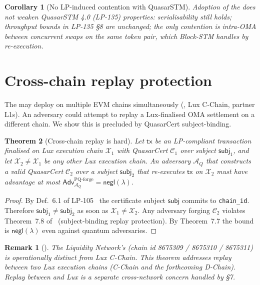 \documentclass[11pt]{article}
\newtheorem{theorem}{Theorem}
\newtheorem{corollary}[theorem]{Corollary}
\newtheorem{remark}{Remark}
\begin{document}
\begin{corollary}[No LP-induced contention with QuasarSTM]
\label{cor:no-contention}
Adoption of the  does not weaken QuasarSTM 4.0
(LP-135) properties: serialisability still holds; throughput bounds
in LP-135 \S8 are unchanged; the only contention is intra-OMA
between concurrent swaps on the same token pair, which Block-STM
handles by re-execution.
\end{corollary}

\section{Cross-chain replay protection}
\label{sec:replay}

The  may deploy on multiple EVM chains
simultaneously (, Lux C-Chain, partner L1s).  An adversary
could attempt to replay a Lux-finalised OMA settlement on a different
chain.  We show this is precluded by QuasarCert subject-binding.

\begin{theorem}[Cross-chain replay is hard]
\label{thm:replay}
Let $\mathsf{tx}$ be an LP-compliant transaction finalised on Lux
execution chain $\mathcal{X}_1$ with QuasarCert $\mathcal{C}_1$ over
subject $\mathsf{subj}_1$, and let $\mathcal{X}_2 \neq \mathcal{X}_1$
be any other Lux execution chain.  An adversary $\mathcal{A}_Q$ that
constructs a valid QuasarCert $\mathcal{C}_2$ over a subject
$\mathsf{subj}_2$ that re-executes $\mathsf{tx}$ on $\mathcal{X}_2$
must have advantage at most
$\mathsf{Adv}^{\mathrm{PQ\text{-}forge}}_{\mathcal{A}_Q} =
\mathsf{negl}(\lambda)$.
\end{theorem}

\begin{proof}
By Def.~6.1 of LP-105~\cite{quasar-cert} the certificate subject
$\mathsf{subj}$ commits to \texttt{chain\_id}.  Therefore
$\mathsf{subj}_1 \neq \mathsf{subj}_2$ as soon as
$\mathcal{X}_1 \neq \mathcal{X}_2$.  Any adversary forging
$\mathcal{C}_2$ violates Theorem~7.8 of~\cite{quasar-cert}
(subject-binding replay protection).  By Theorem~7.7 the bound is
$\mathsf{negl}(\lambda)$ even against quantum adversaries.
\end{proof}

\begin{remark}[]
The Liquidity Network's  (chain id 8675309 / 8675310 /
8675311) is operationally distinct from Lux C-Chain.  This theorem
addresses replay between two \emph{Lux} execution chains
(C-Chain and the forthcoming D-Chain).  Replay between 
and Lux is a separate cross-network concern handled by
\cite{lp-paper} \S7.
\end{remark}
\end{document}
